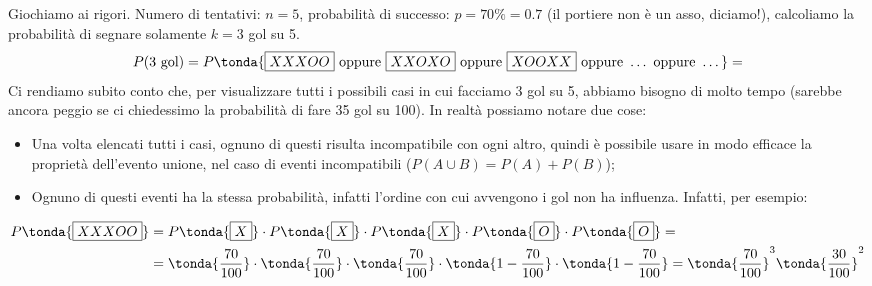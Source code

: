 \begin{esempio} Giochiamo ai rigori. Numero di tentativi: $n=5$, probabilità di successo: $p = 70\%=0.7$ (il portiere non è un asso, diciamo!), calcoliamo la probabilità di segnare solamente $k=3$ gol su 5.
\[P(\text{3 gol})= P\tonda{\text{\boxed{XXXOO}} \text{ oppure } \text{\boxed{XXOXO}} \text{ oppure } \text{\boxed{XOOXX}} \text{ oppure } \dots \text{ oppure } \dots} = \]
Ci rendiamo subito conto che, per visualizzare tutti i possibili casi in cui facciamo 3 gol su 5, abbiamo bisogno di molto tempo (sarebbe ancora peggio se ci chiedessimo la probabilità di fare 35 gol su 100). In realtà possiamo notare due cose: 
\begin{itemize}
\item Una volta elencati tutti i casi, ognuno di questi risulta incompatibile con ogni altro, quindi è possibile usare in modo efficace la proprietà dell'evento unione, nel caso di eventi incompatibili ($P(A \cup B) = P(A) +P(B)$);
\item Ognuno di questi eventi ha la stessa probabilità, infatti l'ordine con cui avvengono i gol non ha influenza. Infatti, per esempio:
\end{itemize}
\[\begin{split}P\tonda{\text{\boxed{XXXOO}}} &= P\tonda{\text{\boxed{X}}} \cdot P\tonda{\text{\boxed{X}}} \cdot P\tonda{\text{\boxed{X}}} \cdot P\tonda{\text{\boxed{O}}} \cdot P\tonda{\text{\boxed{O}}}=\\ &= \tonda{\dfrac{70}{100}} \cdot  \tonda{\dfrac{70}{100}} \cdot  \tonda{\dfrac{70}{100}} \cdot  \tonda{1-\dfrac{70}{100}} \cdot \tonda{ 1-\dfrac{70}{100}} =\tonda{\dfrac{70}{100}}^3 \tonda{\dfrac{30}{100}}^2 \end{split}\]


\end{esempio}
